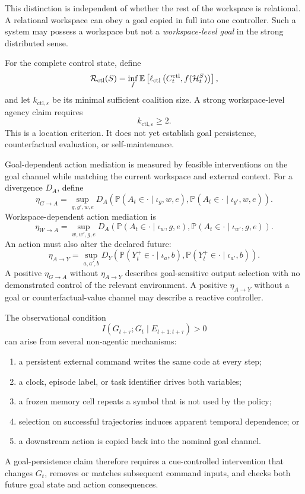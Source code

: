 This distinction is independent of whether the rest of the workspace is
relational. A relational workspace can obey a goal copied in full into one
controller. Such a system may possess a workspace but not a
\emph{workspace-level goal} in the strong distributed sense.

For the complete control state, define
\[
\mathcal R_{\mathrm{ctl}}(S)
=
\inf_f
\mathbb E
\left[
\ell_{\mathrm{ctl}}
\left(
C_t^{\mathrm{ctl}},
f(\mathcal H_t^S)
\right)
\right],
\]
and let \(k_{\mathrm{ctl},\varepsilon}\) be its minimal sufficient coalition
size. A strong workspace-level agency claim requires
\[
\boxed{k_{\mathrm{ctl},\varepsilon}\geq2.}
\]
This is a location criterion. It does not yet establish goal persistence,
counterfactual evaluation, or self-maintenance.


Goal-dependent action mediation is measured by feasible interventions on the
goal channel while matching the current workspace and external context. For
a divergence \(D_A\), define
\[
\eta_{G\to A}
=
\sup_{g,g',w,e}
D_A
\left(
\mathbb P(A_t\in\cdot\mid\iota_g,w,e),
\mathbb P(A_t\in\cdot\mid\iota_{g'},w,e)
\right).
\]
Workspace-dependent action mediation is
\[
\eta_{W\to A}
=
\sup_{w,w',g,e}
D_A
\left(
\mathbb P(A_t\in\cdot\mid\iota_w,g,e),
\mathbb P(A_t\in\cdot\mid\iota_{w'},g,e)
\right).
\]
An action must also alter the declared future:
\[
\eta_{A\to Y}
=
\sup_{a,a',b}
D_Y
\left(
\mathbb P(Y_t^+\in\cdot\mid\iota_a,b),
\mathbb P(Y_t^+\in\cdot\mid\iota_{a'},b)
\right).
\]
A positive \(\eta_{G\to A}\) without \(\eta_{A\to Y}\) describes goal-sensitive
output selection with no demonstrated control of the relevant environment. A
positive \(\eta_{A\to Y}\) without a goal or counterfactual-value channel may
describe a reactive controller.


The observational condition
\[
I(G_{t+\tau};G_t\mid E_{t+1:t+\tau})>0
\]
can arise from several non-agentic mechanisms:
\begin{enumerate}
\item a persistent external command writes the same code at every step;
\item a clock, episode label, or task identifier drives both variables;
\item a frozen memory cell repeats a symbol that is not used by the policy;
\item selection on successful trajectories induces apparent temporal
 dependence; or
\item a downstream action is copied back into the nominal goal channel.
\end{enumerate}
A goal-persistence claim therefore requires a cue-controlled intervention that
changes \(G_t\), removes or matches subsequent command inputs, and checks both
future goal state and action consequences.

